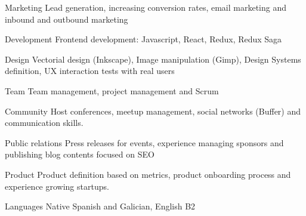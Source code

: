 


\begin{cvskills}


\cvskill
{Marketing} %
{Lead generation, increasing conversion rates, email marketing and inbound and outbound marketing} %


\cvskill
{Development} %
{Frontend development: Javascript, React, Redux, Redux Saga} %


\cvskill
{Design} %
{Vectorial design (Inkscape), Image manipulation (Gimp), Design Systems definition, UX interaction tests with real users} %


\cvskill
{Team} %
{Team management, project management and Scrum} %


\cvskill
{Community} %
{Host conferences, meetup management, social networks (Buffer) and communication skills.} %



\cvskill
{Public relations} %
{Press releases for events, experience managing sponsors and publishing blog contents focused on SEO} %


\cvskill
{Product} %
{Product definition based on metrics,  product onboarding process and experience growing startups.} %


\cvskill
{Languages} %
{Native Spanish and Galician, English B2} %


\end{cvskills}
